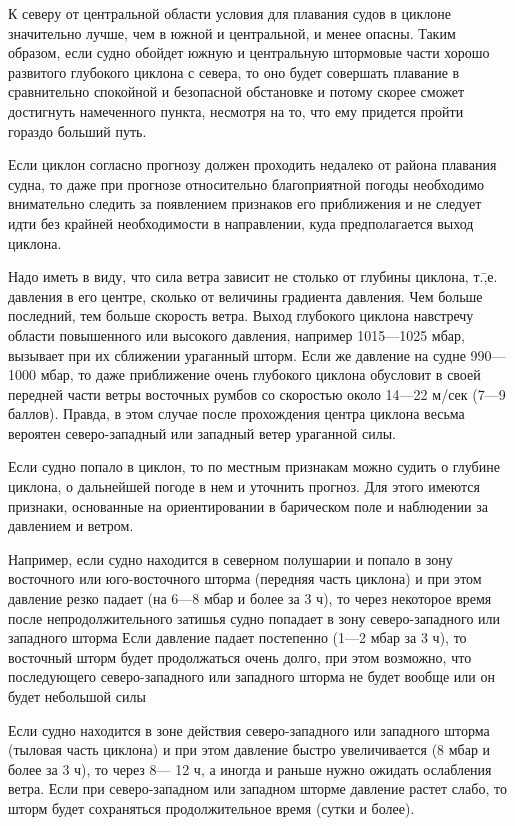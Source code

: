 К северу от центральной области условия для плавания судов в циклоне значительно лучше, чем в южной и центральной, и менее опасны. Таким образом, если судно обойдет южную и центральную штормовые части хорошо развитого глубокого циклона с севера, то оно будет совершать плавание в сравнительно спокойной и безопасной обстановке и потому скорее сможет достигнуть намеченного пункта, несмотря на то, что ему придется пройти гораздо больший путь.

Если циклон согласно прогнозу должен проходить недалеко от района плавания судна, то даже при прогнозе относительно благоприятной погоды необходимо внимательно следить за появлением признаков его приближения и не следует идти без крайней необходимости в направлении, куда предполагается выход циклона.

Надо иметь в виду, что сила ветра зависит не столько от глубины циклона, т.\=,е. давления в его центре, сколько от величины градиента давления. Чем больше последний, тем больше скорость ветра. Выход глубокого циклона навстречу области повышенного или высокого давления, например 1015—1025 мбар, вызывает при их сближении ураганный шторм. Если же давление на судне 990—1000 мбар, то даже приближение очень глубокого циклона обусловит в своей передней части ветры восточных румбов со скоростью около 14—22 м/сек (7—9 баллов). Правда, в этом случае после прохождения центра циклона весьма вероятен северо-западный или западный ветер ураганной силы.

Если судно попало в циклон, то по местным признакам можно судить о глубине циклона, о дальнейшей погоде в нем и уточнить прогноз. Для этого имеются признаки, основанные на ориентировании в барическом поле и наблюдении за давлением и ветром.

Например, если судно находится в северном полушарии и попало в зону восточного или юго-восточного шторма (передняя часть циклона) и при этом давление резко падает (на 6—8 мбар и более за 3 ч), то через некоторое время после непродолжительного затишья судно попадает в зону северо-западного или западного шторма Если давление падает постепенно (1—2 мбар за 3 ч), то восточный шторм будет продолжаться очень долго, при этом возможно, что последующего северо-западного или западного шторма не будет вообще или он будет небольшой силы

Если судно находится в зоне действия северо-западного или западного шторма (тыловая часть циклона) и при этом давление быстро увеличивается (8 мбар и более за 3 ч), то через 8— 12 ч, а иногда и раньше нужно ожидать ослабления ветра. Если при северо-западном или западном шторме давление растет слабо, то шторм будет сохраняться продолжительное время (сутки и более).

